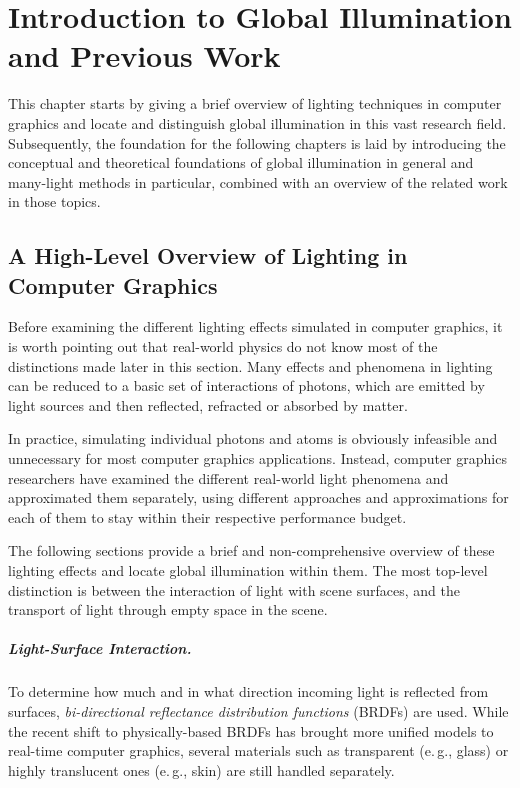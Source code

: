 
\chapter{Introduction to Global Illumination and Previous Work}
\label{chap:introductionGI}

This chapter starts by giving a brief overview of lighting techniques in computer graphics and locate and distinguish global illumination in this vast research field.
Subsequently, the foundation for the following chapters is laid by introducing the conceptual and theoretical foundations of global illumination in general and many-light methods in particular, combined with an overview of the related work in those topics.


\section{A High-Level Overview of Lighting in Computer Graphics}

Before examining the different lighting effects simulated in computer graphics, it is worth pointing out that real-world physics do not know most of the distinctions made later in this section. Many effects and phenomena in lighting can be reduced to a basic set of interactions of photons, which are emitted by light sources and then reflected, refracted or absorbed by matter.

In practice, simulating individual photons and atoms is obviously infeasible and unnecessary for most computer graphics applications. Instead, computer graphics researchers have examined the different real-world light phenomena and approximated them separately, using different approaches and approximations for each of them to stay within their respective performance budget.

The following sections provide a brief and non-comprehensive overview of these lighting effects and locate global illumination within them. The most top-level distinction is between the interaction of light with scene surfaces, and the transport of light through empty space in the scene.

\paragraph{Light-Surface Interaction.}

To determine how much and in what direction incoming light is reflected from surfaces, \textit{bi-directional reflectance distribution functions} (BRDFs) are used. While the recent shift to physically-based BRDFs has brought more unified models to real-time computer graphics, several materials such as transparent (e.\,g., glass) or highly translucent ones (e.\,g., skin) are still handled separately.


